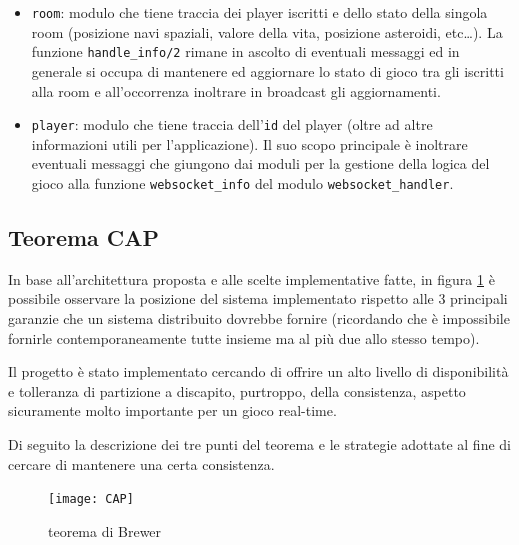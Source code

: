 \documentclass[paper=a4, fontsize=11pt]{scrartcl} %
\numberwithin{equation}{section} %
\numberwithin{figure}{section} %
\numberwithin{table}{section} %
\begin{document}
\begin{itemize}
\item \texttt{room}: modulo che tiene traccia dei player iscritti e dello stato della singola room (posizione navi spaziali, valore della vita, posizione asteroidi, etc\dots).
La funzione \texttt{handle\_info/2} rimane in ascolto di eventuali messaggi ed in generale si occupa di mantenere ed aggiornare lo stato di gioco tra gli iscritti alla room e all'occorrenza inoltrare in broadcast gli aggiornamenti.
\item \texttt{player}: modulo che tiene traccia dell'\texttt{id} del player (oltre ad altre informazioni utili per l'applicazione). Il suo scopo principale è inoltrare eventuali messaggi che giungono dai moduli per la gestione della logica del gioco alla funzione \texttt{websocket\_info} del modulo \texttt{websocket\_handler}.
\end{itemize}

\subsection{Teorema CAP}
In base all'architettura proposta e alle scelte implementative fatte, in figura \ref{CAP} è possibile osservare la posizione del sistema implementato rispetto alle 3 principali garanzie che un sistema distribuito dovrebbe fornire (ricordando che è impossibile fornirle contemporaneamente tutte insieme ma al più due allo stesso tempo).

Il progetto è stato implementato cercando di offrire un alto livello di disponibilità e tolleranza di partizione a discapito, purtroppo, della consistenza, aspetto sicuramente molto importante per un gioco real-time.

Di seguito la descrizione dei tre punti del teorema e le strategie adottate al fine di cercare di mantenere una certa consistenza.
\begin{figure}
\centering
\texttt{[image: CAP]}
\caption{teorema di Brewer}
\label{CAP}
\end{figure}
\end{document}
